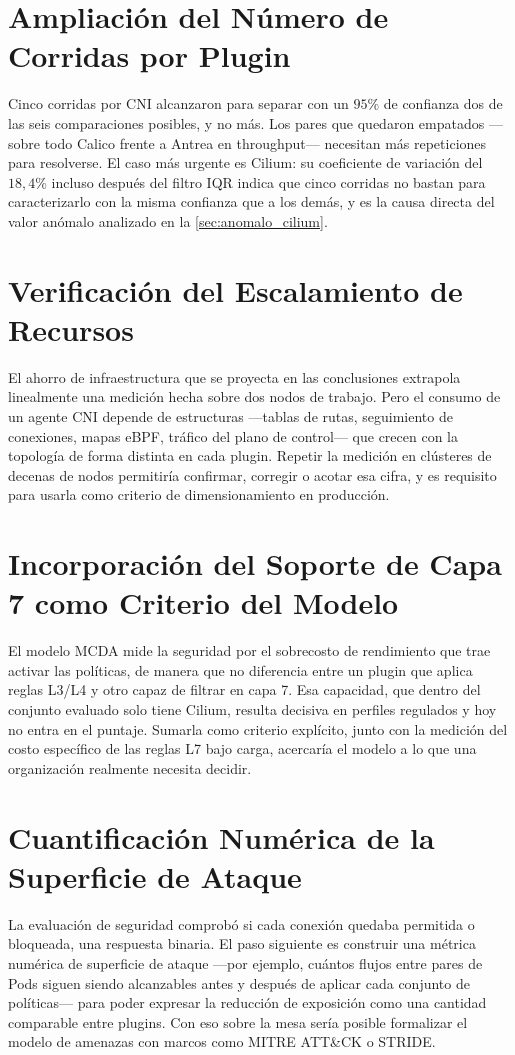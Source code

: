 \section{Ampliación del Número de Corridas por Plugin}
Cinco corridas por CNI alcanzaron para separar con un $95\%$ de confianza dos de las seis comparaciones posibles, y no más. Los pares que quedaron empatados ---sobre todo Calico frente a Antrea en throughput--- necesitan más repeticiones para resolverse. El caso más urgente es Cilium: su coeficiente de variación del $18{,}4\%$ incluso después del filtro IQR indica que cinco corridas no bastan para caracterizarlo con la misma confianza que a los demás, y es la causa directa del valor anómalo analizado en la \cref{sec:anomalo_cilium}.

\section{Verificación del Escalamiento de Recursos}
El ahorro de infraestructura que se proyecta en las conclusiones extrapola linealmente una medición hecha sobre dos nodos de trabajo. Pero el consumo de un agente CNI depende de estructuras ---tablas de rutas, seguimiento de conexiones, mapas eBPF, tráfico del plano de control--- que crecen con la topología de forma distinta en cada plugin. Repetir la medición en clústeres de decenas de nodos permitiría confirmar, corregir o acotar esa cifra, y es requisito para usarla como criterio de dimensionamiento en producción.

\section{Incorporación del Soporte de Capa 7 como Criterio del Modelo}
El modelo MCDA mide la seguridad por el sobrecosto de rendimiento que trae activar las políticas, de manera que no diferencia entre un plugin que aplica reglas L3/L4 y otro capaz de filtrar en capa 7. Esa capacidad, que dentro del conjunto evaluado solo tiene Cilium, resulta decisiva en perfiles regulados y hoy no entra en el puntaje. Sumarla como criterio explícito, junto con la medición del costo específico de las reglas L7 bajo carga, acercaría el modelo a lo que una organización realmente necesita decidir.

\section{Cuantificación Numérica de la Superficie de Ataque}
La evaluación de seguridad comprobó si cada conexión quedaba permitida o bloqueada, una respuesta binaria. El paso siguiente es construir una métrica numérica de superficie de ataque ---por ejemplo, cuántos flujos entre pares de Pods siguen siendo alcanzables antes y después de aplicar cada conjunto de políticas--- para poder expresar la reducción de exposición como una cantidad comparable entre plugins. Con eso sobre la mesa sería posible formalizar el modelo de amenazas con marcos como MITRE ATT\&CK o STRIDE.

